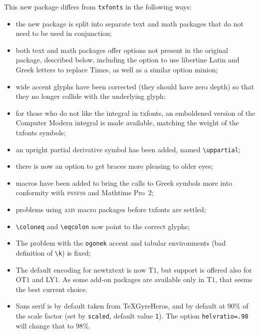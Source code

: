 \documentclass[11pt]{article}
\begin{document}
This new package differs from {\tt txfonts} in the following ways:
\begin{itemize}
\item
the new package is split into separate text and math packages that do not need to be used in conjunction;
\item both text and math packages offer options not present in the original package, described below, including the option to use \textsf{libertine} Latin and Greek letters to replace \textsf{Times}, as well as a similar option \textsf{minion};
\item wide accent glyphs have been corrected (they should have zero depth) so that they no longer collide with the underlying glyph;
\item for those who do not like the integral in \textsf{txfonts}, an emboldened version of the Computer Modern integral is made available, matching the weight of the \textsf{txfonts} symbols;
\item an upright partial derivative symbol has been added, named \verb|\uppartial|;
\item there is now an option to get braces more pleasing to older eyes;
\item macros have been added to bring the calls to Greek symbols more into conformity with \textsc{psnfss} and Mathtime Pro~2;
\item problems using \textsc{ams} macro packages before \textsf{txfonts} are settled;
\item \verb|\coloneq| and \verb|\eqcolon| now point to the correct glyphs;
\item The problem with the {\tt ogonek} accent  and tabular environments (bad definition of \verb|\k|) is fixed;
\item The default encoding for \textsf{newtxtext} is now T$1$, but support is offered also for OT$1$ and LY$1$. As some add-on packages are available only in T$1$, that seems the best current choice.
\item Sans serif is by default taken from TeXGyreHeros, and by default at 90\% of the scale factor (set by {\tt scaled}, default value {\tt1}). The option {\tt helvratio=.98} will change that to 98\%.
\end{itemize}
\end{document}
